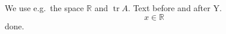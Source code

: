 We use e.g.\ the space $\mathbb{R}$ and $\operatorname{tr}A$.
Text before
and after Y.
\begin{equation}x \in \mathbb{R}\end{equation}done.
